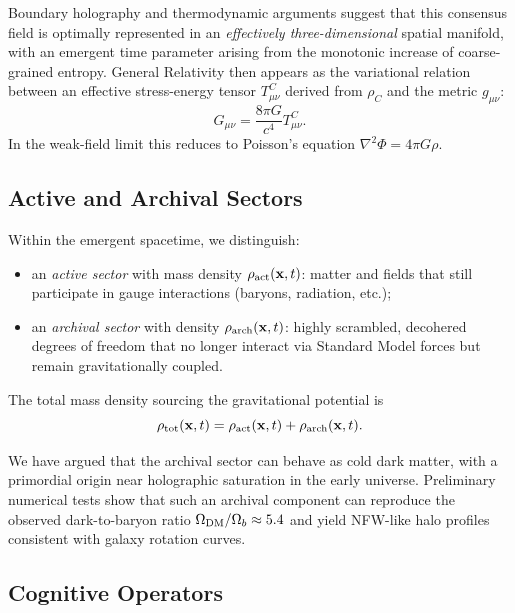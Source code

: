 \documentclass[12pt,a4paper]{article}
\begin{document}
Boundary holography and thermodynamic arguments suggest that this consensus field is optimally represented in an \emph{effectively three-dimensional} spatial manifold, with an emergent time parameter arising from the monotonic increase of coarse-grained entropy. General Relativity then appears as the variational relation between an effective stress-energy tensor $T^C_{\mu\nu}$ derived from $\rho_C$ and the metric $g_{\mu\nu}$:
\begin{equation}
  G_{\mu\nu} = \frac{8\pi G}{c^4} T^C_{\mu\nu}.
\end{equation}
In the weak-field limit this reduces to Poisson's equation $\nabla^2\Phi = 4\pi G\rho$.

\subsection{Active and Archival Sectors}
\label{subsec:archival}

Within the emergent spacetime, we distinguish:
\begin{itemize}
  \item an \emph{active sector} with mass density $\rho_{\rm act}(\mathbf{x},t)$: matter and fields that still participate in gauge interactions (baryons, radiation, etc.);
  \item an \emph{archival sector} with density $\rho_{\rm arch}(\mathbf{x},t)$: highly scrambled, decohered degrees of freedom that no longer interact via Standard Model forces but remain gravitationally coupled.
\end{itemize}
The total mass density sourcing the gravitational potential is
\begin{equation}
  \rho_{\rm tot}(\mathbf{x},t) = \rho_{\rm act}(\mathbf{x},t) + \rho_{\rm arch}(\mathbf{x},t).
\end{equation}

We have argued that the archival sector can behave as cold dark matter, with a primordial origin near holographic saturation in the early universe. Preliminary numerical tests show that such an archival component can reproduce the observed dark-to-baryon ratio $\Omega_{\rm DM}/\Omega_b \approx 5.4$ and yield NFW-like halo profiles consistent with galaxy rotation curves.

\subsection{Cognitive Operators}
\label{subsec:cognitive_operators}
\end{document}
